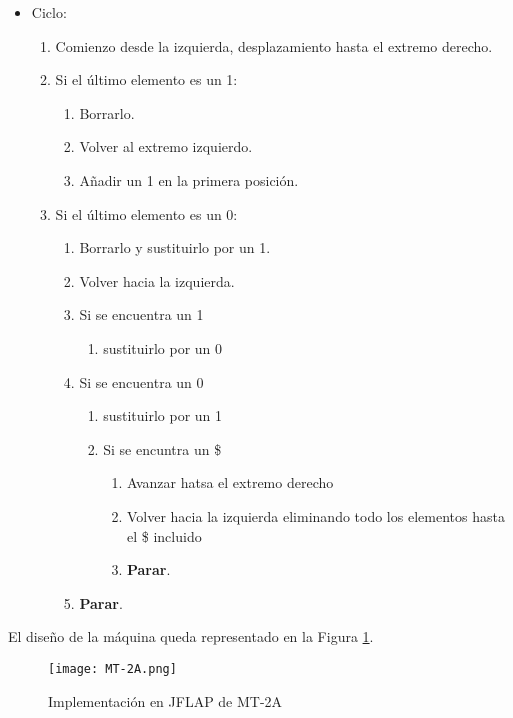 \begin{itemize}
    \item Ciclo:
    \begin{enumerate}[1.]
        \item Comienzo desde la izquierda, desplazamiento hasta el extremo derecho.
        \item Si el último elemento es un 1:
        \begin{enumerate}[1.]
            \item Borrarlo.
            \item Volver al extremo izquierdo.
            \item Añadir un 1 en la primera posición.
        \end{enumerate}
        \item Si el último elemento es un 0:
        \begin{enumerate}[1.]
            \item Borrarlo y sustituirlo por un 1.
            \item Volver hacia la izquierda.
            \item Si se encuentra un 1 
            \begin{enumerate}[1.] 
                \item sustituirlo por un 0
            \end{enumerate}
            \item Si se encuentra un 0
            \begin{enumerate}[1.]
                \item sustituirlo por un 1
                \item Si se encuntra un \$
                \begin{enumerate}[1.]
                    \item Avanzar hatsa el extremo derecho
                    \item Volver hacia la izquierda eliminando todo los elementos hasta el \$ incluido
                    \item \textbf{Parar}.
                \end{enumerate}
            \end{enumerate}
            \item \textbf{Parar}.
        \end{enumerate}
    \end{enumerate}
\end{itemize}

El diseño de la máquina queda representado en la Figura \ref{fig:MT-2A}.

\begin{figure}[h]
    \centering
    \texttt{[image: MT-2A.png]}
    \caption{Implementación en JFLAP de MT-2A}
    \label{fig:MT-2A}
\end{figure}